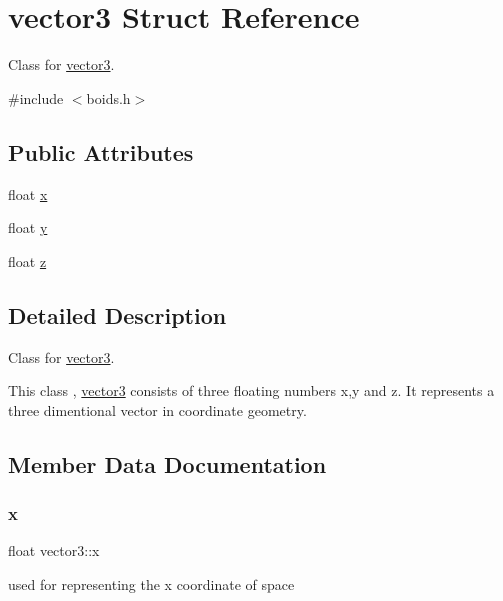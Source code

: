 \hypertarget{structvector3}{}\section{vector3 Struct Reference}
\label{structvector3}


Class for \mbox{\hyperlink{structvector3}{vector3}}.  




{\ttfamily \#include $<$boids.\+h$>$}

\subsection*{Public Attributes}
\begin{DoxyCompactItemize}
\item 
float \mbox{\hyperlink{structvector3_ac8ec8f1bd94c5063f00e026155aaee28}{x}}
\item 
float \mbox{\hyperlink{structvector3_a5200950ba6a3e3b1f0d5f6329e84e7c6}{y}}
\item 
float \mbox{\hyperlink{structvector3_a850da8a0f71ec04b32739c4410a60746}{z}}
\end{DoxyCompactItemize}


\subsection{Detailed Description}
Class for \mbox{\hyperlink{structvector3}{vector3}}. 

This class , \mbox{\hyperlink{structvector3}{vector3}} consists of three floating numbers x,y and z. It represents a three dimentional vector in coordinate geometry. 

\subsection{Member Data Documentation}
\mbox{\label{structvector3_ac8ec8f1bd94c5063f00e026155aaee28}} 
\subsubsection{\texorpdfstring{x}{x}}
{\footnotesize\ttfamily float vector3\+::x}

used for representing the x coordinate of space \mbox{\label{structvector3_a5200950ba6a3e3b1f0d5f6329e84e7c6}} 
